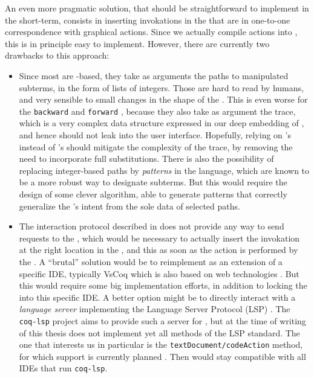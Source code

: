 An even more pragmatic solution, that should be straightforward to implement in
the short-term, consists in inserting  invokations in the 
that are in one-to-one correspondence with graphical actions. Since we actually
compile actions into , this is in principle easy to implement. However,
there are currently two drawbacks to this approach:
\begin{itemize}
  \item Since most  are -based, they take as arguments the
  paths to manipulated subterms, in the form of lists of integers. Those are
  hard to read by humans, and very sensible to small changes in the shape of the
  . This is even worse for the \texttt{backward} and \texttt{forward}
  , because they also take as argument the  trace,
  which is a very complex data structure expressed in our deep embedding of
  , and hence should not leak into the user interface.
  Hopefully, relying on 's  instead of 's should mitigate
  the complexity of the trace, by removing the need to incorporate full
  substitutions. There is also the possibility of replacing integer-based paths
  by \emph{patterns} in the {\kl{\ssreflect}} language, which are known to be a more
  robust way to designate subterms. But this would require the design of some
  clever algorithm, able to generate patterns that correctly generalize the
  's intent from the sole data of selected paths.

  \item The interaction protocol described in  does not provide
  any way to send requests to the , which would be necessary to
  actually insert the  invokation at the right location in the , and this as soon as the action is performed by the . A
  ``brutal'' solution would be to reimplement  as an
  extension of a specific IDE, typically VsCoq which is also based on web
  technologies \cite{VsCoq}. But this would require some big implementation
  efforts, in addition to locking the  into this specific IDE. A
  better option might be to directly interact with a \emph{language server}
  implementing the Language Server Protocol (LSP) \cite{LSP}. The
  \texttt{coq-lsp} project aims to provide such a server for , but at the
  time of writing of this thesis does not implement yet all methods of the LSP
  standard. The one that interests us in particular is the
  \texttt{textDocument/codeAction} method, for which support is currently
  planned \cite{coq-lsp-proto}. Then  would stay compatible
  with all IDEs that run \texttt{coq-lsp}.
\end{itemize}
